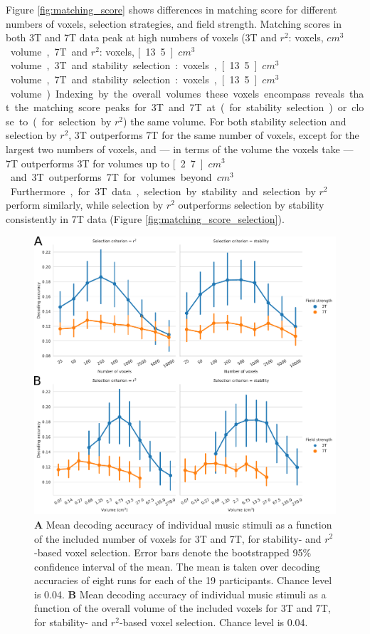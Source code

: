 Figure \ref{fig:matching_score} shows differences in matching score for different numbers of voxels, selection strategies, and field strength. Matching scores in both 3T and 7T data peak at high numbers of voxels (3T and $r^{2}$: \unit[1000]{voxels}, \unit[27]{$cm^{3}$} volume, 7T and $r^{2}$: \unit[5000]{voxels}, \unit[13.5]{$cm^{3}$} volume, 3T and stability selection: \unit[500]{voxels}, \unit[13.5]{$cm^{3}$} volume, 7T and stability selection: \unit[5000]{voxels}, \unit[13.5]{$cm^{3}$} volume). Indexing by the overall volumes these voxels encompass reveals that the matching score peaks for 3T and 7T at (for stability selection) or close to (for selection by $r^{2}$) the same volume. For both stability selection and selection by $r^{2}$, 3T outperforms 7T for the same number of voxels, except for the largest two numbers of voxels, and --- in terms of the volume the voxels take --- 7T outperforms 3T for volumes up to \unit[2.7]{$cm^{3}$} and 3T outperforms 7T for volumes beyond \unit[27]{$cm^{3}$}. Furthermore, for 3T data, selection by stability and selection by $r^{2}$ perform similarly, while selection by $r^{2}$ outperforms selection by stability consistently in 7T data (Figure \ref{fig:matching_score_selection}).

\begin{figure}
  \centering
    \includegraphics[width=\linewidth]{pics/decoding.pdf}

	\caption{\textbf{A} Mean decoding accuracy of individual music stimuli as a function of
  the included number of voxels for 3T and 7T, for stability- and
  $r^2$-based voxel selection. Error bars denote the bootstrapped 95\%
  confidence interval of the mean. The mean is taken over decoding
  accuracies of eight runs for each of the 19 participants. Chance level is
    0.04. \textbf{B} Mean
decoding accuracy of individual music stimuli as a function of the overall volume of the
included voxels for 3T and 7T, for stability- and $r^2$-based voxel
selection. Chance level is 0.04.
}
 \label{fig:decoding_accuracy_stimulus}
\end{figure}

